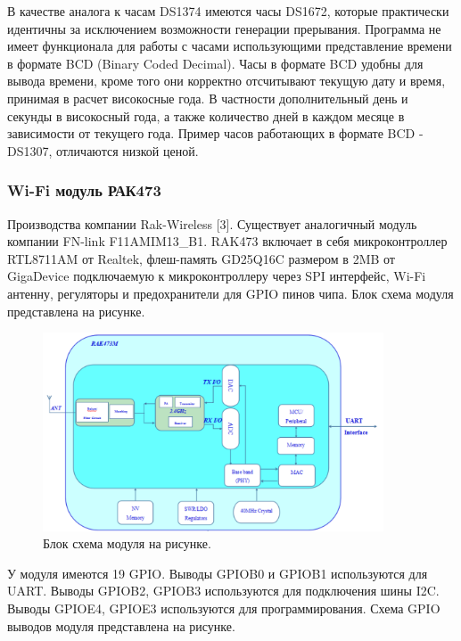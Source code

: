 В качестве аналога к часам DS1374 имеются часы DS1672, которые практически идентичны за исключением возможности генерации прерывания. 
Программа не имеет функционала для работы с часами использующими представление времени в формате BCD (Binary Coded Decimal). Часы в формате BCD удобны для вывода времени, кроме того они корректно отсчитывают текущую дату и время, принимая в расчет високосные года. В частности дополнительный день и секунды в високосный года, а также количество дней в каждом месяце в зависимости от текущего года. 
Пример часов работающих в формате BCD - DS1307, отличаются низкой ценой.


\subsubsection{ Wi-Fi модуль РАК473 }
Производства компании Rak-Wireless [3]. 
Существует аналогичный модуль компании FN-link F11AMIM13\_B1. RAK473 включает в себя микроконтроллер RTL8711AM от Realtek, флеш-память GD25Q16C размером в 2MB от GigaDevice подключаемую к микроконтроллеру через SPI интерфейс, Wi-Fi антенну, регуляторы и предохранители для GPIO пинов чипа. Блок схема модуля представлена на рисунке.

\begin{figure}[h!]
    \centering
    \includegraphics[width=0.9\textwidth]{rak473_block_diagram.png}
    \caption{Блок схема модуля на рисунке.}
\end{figure}

У модуля имеются 19 GPIO. 
Выводы GPIOB0 и GPIOB1 используются для UART.
Выводы GPIOB2, GPIOB3 используются для подключения шины I2C.
Выводы GPIOE4, GPIOE3 используются для программирования.
Схема GPIO выводов модуля представлена на рисунке.

